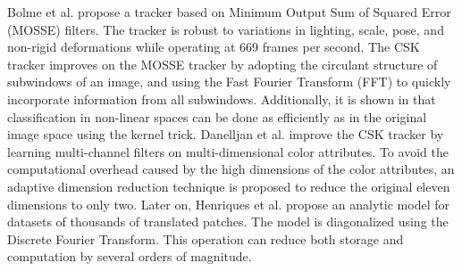 \documentclass[review]{elsarticle}
\begin{document}
\begin{CJK*}{UTF8}{gbsn}
Bolme et al. propose a tracker \cite{Bolme2010VisualOT} based on Minimum Output Sum of Squared Error (MOSSE) filters. The tracker is robust to variations in lighting, scale, pose, and non-rigid deformations while operating at 669 frames per second.
The CSK tracker \cite{Henriques2012ExploitingTC} improves on the MOSSE tracker by adopting the circulant structure of subwindows of an image, and using the Fast Fourier Transform (FFT) to quickly incorporate information from all subwindows. Additionally, it is shown in \cite{Henriques2012ExploitingTC} that classification in non-linear spaces can be done as efficiently as in the original image space using the kernel trick.
Danelljan et al. \cite{Danelljan2014AdaptiveCA} improve the CSK tracker by learning multi-channel filters on multi-dimensional color attributes. To avoid the computational overhead caused by the high dimensions of the color attributes, an adaptive dimension reduction technique is proposed \cite{Danelljan2014AdaptiveCA} to reduce the original eleven dimensions to only two.
Later on, Henriques et al. \cite{Henriques2015HighSpeedTW} propose an analytic model for datasets of thousands of translated patches. The model is diagonalized using the Discrete Fourier Transform. This operation can reduce both storage and computation by several orders of magnitude.


\end{CJK*}
\end{document}
